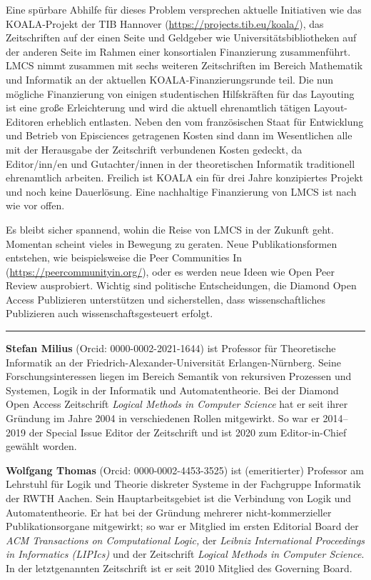 \documentclass[a4paper,
fontsize=11pt,
oneside,
numbers=noperiodatend,
parskip=half-,
bibliography=totoc,
final
]{scrartcl}
\begin{document}
Eine spürbare Abhilfe für dieses Problem versprechen aktuelle
Initiativen wie das KOALA-Projekt der TIB Hannover
(\url{https://projects.tib.eu/koala/}), das Zeitschriften auf der einen
Seite und Geldgeber wie Universitätsbibliotheken auf der anderen Seite
im Rahmen einer konsortialen Finanzierung zusammenführt. LMCS nimmt
zusammen mit sechs weiteren Zeitschriften im Bereich Mathematik und
Informatik an der aktuellen KOALA-Finanzierungsrunde teil. Die nun
mögliche Finanzierung von einigen studentischen Hilfskräften für das
Layouting ist eine große Erleichterung und wird die aktuell ehrenamtlich
tätigen Layout-Editoren erheblich entlasten. Neben den vom französischen
Staat für Entwicklung und Betrieb von Episciences getragenen Kosten sind
dann im Wesentlichen alle mit der Herausgabe der Zeitschrift verbundenen
Kosten gedeckt, da Editor/inn/en und Gutachter/innen in der
theoretischen Informatik traditionell ehrenamtlich arbeiten. Freilich
ist KOALA ein für drei Jahre konzipiertes Projekt und noch keine
Dauerlösung. Eine nachhaltige Finanzierung von LMCS ist nach wie vor
offen.

Es bleibt sicher spannend, wohin die Reise von LMCS in der Zukunft geht.
Momentan scheint vieles in Bewegung zu geraten. Neue Publikationsformen
entstehen, wie beispielsweise die Peer Communities In
(\url{https://peercommunityin.org/}), oder es werden neue Ideen wie Open
Peer Review ausprobiert. Wichtig sind politische Entscheidungen, die
Diamond Open Access Publizieren unterstützen und sicherstellen, dass
wissenschaftliches Publizieren auch wissenschaftsgesteuert erfolgt.

\begin{center}\rule{0.5\linewidth}{0.5pt}\end{center}

\textbf{Stefan Milius} (Orcid: 0000-0002-2021-1644) ist Professor für
Theoretische Informatik an der Friedrich-Alexander-Universität
Erlangen-Nürnberg. Seine Forschungsinteressen liegen im Bereich Semantik
von rekursiven Prozessen und Systemen, Logik in der Informatik und
Automatentheorie. Bei der Diamond Open Access Zeitschrift \emph{Logical
Methods in Computer Science} hat er seit ihrer Gründung im Jahre 2004 in
verschiedenen Rollen mitgewirkt. So war er 2014--2019 der Special Issue
Editor der Zeitschrift und ist 2020 zum Editor-in-Chief gewählt worden.

\textbf{Wolfgang Thomas} (Orcid: 0000-0002-4453-3525) ist (emeritierter)
Professor am Lehrstuhl für Logik und Theorie diskreter Systeme in der
Fachgruppe Informatik der RWTH Aachen. Sein Hauptarbeitsgebiet ist die
Verbindung von Logik und Automatentheorie. Er hat bei der Gründung
mehrerer nicht-kommerzieller Publikationsorgane mitgewirkt; so war er
Mitglied im ersten Editorial Board der \emph{ACM Transactions on
Computational Logic,} der \emph{Leibniz International Proceedings in
Informatics (LIPIcs)} und der Zeitschrift \emph{Logical Methods in
Computer Science}. In der letztgenannten Zeitschrift ist er seit 2010
Mitglied des Governing Board.
\end{document}

